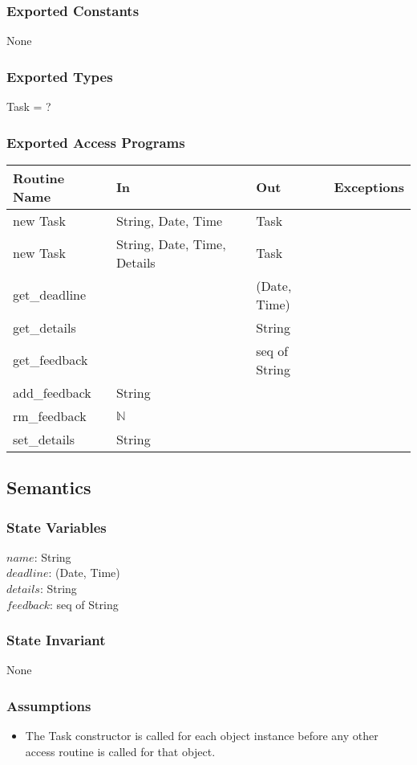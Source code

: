 \documentclass[12pt, titlepage]{article}
\begin{document}
\subsubsection* {Exported Constants}
None

\subsubsection* {Exported Types}
Task = ?

\subsubsection* {Exported Access Programs}
\begin{tabular}{|l|l|l|l|}
    \hline
    \textbf{Routine Name} & \textbf{In} & \textbf{Out} & \textbf{Exceptions} \\
    \hline
    new Task & String, Date, Time & Task & \\
    \hline
    new Task & String, Date, Time, Details & Task & \\
    \hline
    get\_deadline & & (Date, Time) & \\
    \hline
    get\_details & & String & \\
    \hline
    get\_feedback & & seq of String& \\
    \hline
    add\_feedback & String & & \\
    \hline
    rm\_feedback & $\mathbb{N}$ &&\\
    \hline
    set\_details & String & & \\
    \hline
\end{tabular}

\subsection*{Semantics}
\subsubsection*{State Variables}
$name$: String\\
$deadline$: (Date, Time) \\
$details$: String\\
$feedback$: seq of String

\subsubsection*{State Invariant}
None

\subsubsection*{Assumptions}
\begin{itemize}
  \item The Task constructor is called for each object instance before any other access routine is called for that object.
\end{itemize}
\end{document}
